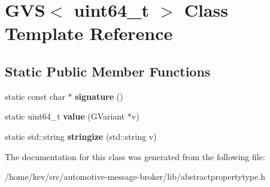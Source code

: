 \hypertarget{classGVS_3_01uint64__t_01_4}{\section{G\-V\-S$<$ uint64\-\_\-t $>$ Class Template Reference}
\label{classGVS_3_01uint64__t_01_4}
}
\subsection*{Static Public Member Functions}
\begin{DoxyCompactItemize}
\item 
\hypertarget{classGVS_3_01uint64__t_01_4_af3a581bec16849dd09e5a46a68ee5c9a}{static const char $\ast$ {\bfseries signature} ()}\label{classGVS_3_01uint64__t_01_4_af3a581bec16849dd09e5a46a68ee5c9a}

\item 
\hypertarget{classGVS_3_01uint64__t_01_4_a2d48a0a60faa407a338bf886f8120e44}{static uint64\-\_\-t {\bfseries value} (G\-Variant $\ast$v)}\label{classGVS_3_01uint64__t_01_4_a2d48a0a60faa407a338bf886f8120e44}

\item 
\hypertarget{classGVS_3_01uint64__t_01_4_a85e2ae3bd54dd831724a7cda94bcf5cb}{static std\-::string {\bfseries stringize} (std\-::string v)}\label{classGVS_3_01uint64__t_01_4_a85e2ae3bd54dd831724a7cda94bcf5cb}

\end{DoxyCompactItemize}


The documentation for this class was generated from the following file\-:\begin{DoxyCompactItemize}
\item 
/home/kev/src/automotive-\/message-\/broker/lib/abstractpropertytype.\-h\end{DoxyCompactItemize}
